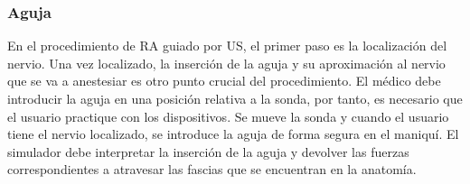 




\subsubsection{Aguja}
\label{rasim:aguja}
En el procedimiento de \ac{RA} guiado por \ac{US}, el primer paso es la localización del nervio. Una vez localizado, la inserción de la aguja y su aproximación al nervio que se va a anestesiar es otro punto crucial del procedimiento. El médico debe introducir la aguja en una posición relativa a la sonda, por tanto, es necesario que el usuario practique con los dispositivos. Se mueve la sonda y cuando el usuario tiene el nervio localizado, se introduce la aguja de forma segura en el maniquí. El simulador debe interpretar la inserción de la aguja y devolver las fuerzas correspondientes a atravesar las fascias que se encuentran en la anatomía. 

